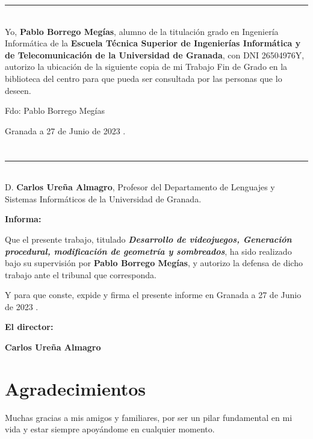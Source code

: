 \noindent\rule[-1ex]{\textwidth}{2pt}\\[4.5ex]

Yo, \textbf{Pablo Borrego Megías}, alumno de la titulación grado en Ingeniería Informática de la \textbf{Escuela Técnica Superior
de Ingenierías Informática y de Telecomunicación de la Universidad de Granada}, con DNI 26504976Y, autorizo la
ubicación de la siguiente copia de mi Trabajo Fin de Grado en la biblioteca del centro para que pueda ser
consultada por las personas que lo deseen.

\vspace{6cm}

\noindent Fdo: Pablo Borrego Megías

\vspace{2cm}

\begin{flushright}
Granada a 27 de Junio de 2023 .
\end{flushright}


\chapter*{}
\thispagestyle{empty}

\noindent\rule[-1ex]{\textwidth}{2pt}\\[4.5ex]

D. \textbf{Carlos Ureña Almagro}, Profesor del Departamento de Lenguajes y Sistemas Informáticos de la Universidad de Granada.

\vspace{0.5cm}

\textbf{Informa:}

\vspace{0.5cm}

Que el presente trabajo, titulado \textit{\textbf{Desarrollo de videojuegos, Generación procedural, modificación de geometría y sombreados}},
ha sido realizado bajo su supervisión por \textbf{Pablo Borrego Megías}, y autorizo la defensa de dicho trabajo ante el tribunal
que corresponda.

\vspace{0.5cm}

Y para que conste, expide y firma el presente informe en Granada a 27 de Junio de 2023 .

\vspace{1cm}

\textbf{El director:}

\vspace{5cm}

\noindent \textbf{Carlos Ureña Almagro}

\chapter*{Agradecimientos}
\thispagestyle{empty}

       \vspace{1cm}


Muchas gracias a mis amigos y familiares, por ser un pilar fundamental en mi vida y estar siempre apoyándome en cualquier momento.

